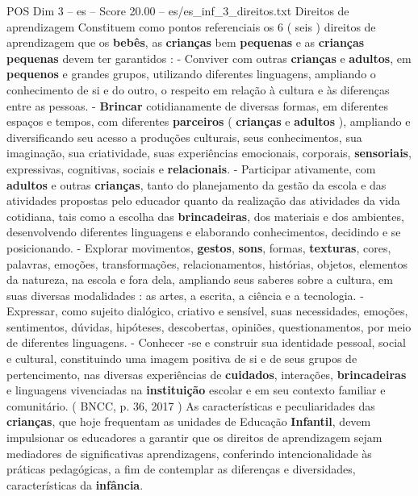 \begin{textsample}{POS Dim 3 – es – Score 20.00 – es/es\_inf\_3\_direitos.txt}  \label{ex:f3_pos_116}
Direitos de aprendizagem Constituem como pontos referenciais os 6 ( seis ) direitos de aprendizagem que os \textbf{bebês}, as \textbf{crianças} bem \textbf{pequenas} e as \textbf{crianças} \textbf{pequenas} devem ter garantidos : - Conviver com outras \textbf{crianças} e \textbf{adultos}, em \textbf{pequenos} e grandes grupos, utilizando diferentes linguagens, ampliando o conhecimento de si e do outro, o respeito em relação à cultura e às diferenças entre as pessoas. - \textbf{Brincar} cotidianamente de diversas formas, em diferentes espaços e tempos, com diferentes \textbf{parceiros} ( \textbf{crianças} e \textbf{adultos} ), ampliando e diversificando seu acesso a produções culturais, seus conhecimentos, sua imaginação, sua criatividade, suas experiências emocionais, corporais, \textbf{sensoriais}, expressivas, cognitivas, sociais e \textbf{relacionais}. - Participar ativamente, com \textbf{adultos} e outras \textbf{crianças}, tanto do planejamento da gestão da escola e das atividades propostas pelo educador quanto da realização das atividades da vida cotidiana, tais como a escolha das \textbf{brincadeiras}, dos materiais e dos ambientes, desenvolvendo diferentes linguagens e elaborando conhecimentos, decidindo e se posicionando. - Explorar movimentos, \textbf{gestos}, \textbf{sons}, formas, \textbf{texturas}, cores, palavras, emoções, transformações, relacionamentos, histórias, objetos, elementos da natureza, na escola e fora dela, ampliando seus saberes sobre a cultura, em suas diversas modalidades : as artes, a escrita, a ciência e a tecnologia. - Expressar, como sujeito dialógico, criativo e sensível, suas necessidades, emoções, sentimentos, dúvidas, hipóteses, descobertas, opiniões, questionamentos, por meio de diferentes linguagens. - Conhecer -se e construir sua identidade pessoal, social e cultural, constituindo uma imagem positiva de si e de seus grupos de pertencimento, nas diversas experiências de \textbf{cuidados}, interações, \textbf{brincadeiras} e linguagens vivenciadas na \textbf{instituição} escolar e em seu contexto familiar e comunitário. ( BNCC, p. 36, 2017 ) As características e peculiaridades das \textbf{crianças}, que hoje frequentam as unidades de Educação \textbf{Infantil}, devem impulsionar os educadores a garantir que os direitos de aprendizagem sejam mediadores de significativas aprendizagens, conferindo intencionalidade às práticas pedagógicas, a fim de contemplar as diferenças e diversidades, características da \textbf{infância}.

\end{textsample}

